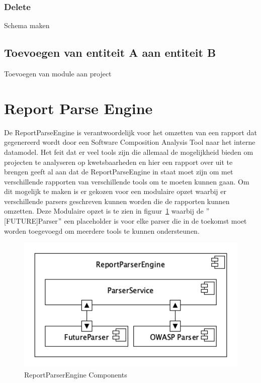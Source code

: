 \subsubsection*{Delete}Schema maken

\subsection{Toevoegen van entiteit A aan entiteit B}\label{subsec:toevoegen-van-entiteit-a-aan-entiteit-b}
Toevoegen van module aan project



\section{Report Parse Engine}
De ReportParseEngine is verantwoordelijk voor het omzetten van een rapport dat gegenereerd wordt door een Software Composition Analysis Tool naar het interne datamodel. Het feit dat er veel tools zijn die allemaal de mogelijkheid bieden om projecten te analyseren op kwetsbaarheden en hier een rapport over uit te brengen geeft al aan dat de ReportParseEngine in staat moet zijn om met verschillende rapporten van verschillende tools om te moeten kunnen gaan. Om dit mogelijk te maken is er gekozen voor een modulaire opzet waarbij er verschillende parsers geschreven kunnen worden die de rapporten kunnen omzetten. Deze Modulaire opzet is te zien in figuur~\ref{fig:ReportParserComponents} waarbij de $"$[FUTURE]Parser$"$ een placeholder is voor elke parser die in de toekomst moet worden toegevoegd om meerdere tools te kunnen ondersteunen.
\begin{figure}[bth]
    \myfloatalign
    \includegraphics[width=12cm]{gfx/umlet/exports/ReportParserComponents}
    \caption{ReportParserEngine Components}
    \label{fig:ReportParserComponents}
\end{figure}



